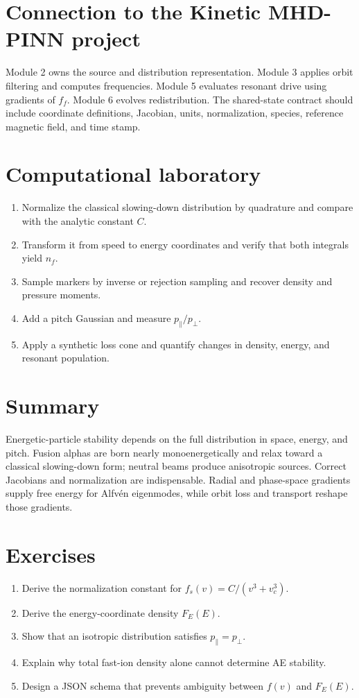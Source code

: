\documentclass[11pt]{article}
\begin{document}
\section{Connection to the Kinetic MHD-PINN project}
Module 2 owns the source and distribution representation. Module 3 applies orbit filtering and computes frequencies. Module 5 evaluates resonant drive using gradients of $f_f$. Module 6 evolves redistribution. The shared-state contract should include coordinate definitions, Jacobian, units, normalization, species, reference magnetic field, and time stamp.

\section{Computational laboratory}
\begin{enumerate}[leftmargin=1.6em]
\item Normalize the classical slowing-down distribution by quadrature and compare with the analytic constant $C$.
\item Transform it from speed to energy coordinates and verify that both integrals yield $n_f$.
\item Sample markers by inverse or rejection sampling and recover density and pressure moments.
\item Add a pitch Gaussian and measure $p_\parallel/p_\perp$.
\item Apply a synthetic loss cone and quantify changes in density, energy, and resonant population.
\end{enumerate}

\section{Summary}
Energetic-particle stability depends on the full distribution in space, energy, and pitch. Fusion alphas are born nearly monoenergetically and relax toward a classical slowing-down form; neutral beams produce anisotropic sources. Correct Jacobians and normalization are indispensable. Radial and phase-space gradients supply free energy for Alfv\'en eigenmodes, while orbit loss and transport reshape those gradients.

\section{Exercises}
\begin{enumerate}[leftmargin=1.6em]
\item Derive the normalization constant for $f_s(v)=C/(v^3+v_c^3)$.
\item Derive the energy-coordinate density $F_E(E)$.
\item Show that an isotropic distribution satisfies $p_\parallel=p_\perp$.
\item Explain why total fast-ion density alone cannot determine AE stability.
\item Design a JSON schema that prevents ambiguity between $f(v)$ and $F_E(E)$.
\end{enumerate}
\end{document}
